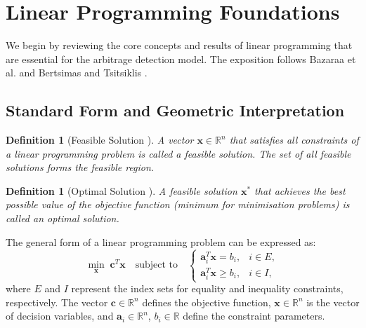 \documentclass[openany]{book}
\numberwithin{figure}{chapter}
\numberwithin{equation}{chapter}
\newtheorem{definition}[theorem]{Definition}
\begin{document}

\section{Linear Programming Foundations}

We begin by reviewing the core concepts and results of linear programming that are essential for the arbitrage detection model. The exposition follows Bazaraa et al. \cite{bazaraa2006} and Bertsimas and Tsitsiklis \cite{bertsimas1997}.

\subsection{Standard Form and Geometric Interpretation}

\begin{definition}[Feasible Solution {\cite{bazaraa2006}}]
A vector $\mathbf{x} \in \mathbb{R}^n$ that satisfies all constraints of a linear programming problem is called a \textit{feasible solution}. The set of all feasible solutions forms the \textit{feasible region}.
\end{definition}

\begin{definition}[Optimal Solution {\cite{bazaraa2006}}]
A feasible solution $\mathbf{x}^*$ that achieves the best possible value of the objective function (minimum for minimisation problems) is called an \textit{optimal solution}.
\end{definition}

The general form of a linear programming problem can be expressed as:
\begin{equation}
\min_{\mathbf{x}} \; \mathbf{c}^T\mathbf{x} \quad \text{subject to} \quad 
\begin{cases}
\mathbf{a}_i^T \mathbf{x} = b_i, & i \in E, \\
\mathbf{a}_i^T \mathbf{x} \geq b_i, & i \in I,
\end{cases}
\label{eq:lp_general}
\end{equation}
where $E$ and $I$ represent the index sets for equality and inequality constraints, respectively. The vector $\mathbf{c} \in \mathbb{R}^n$ defines the objective function, $\mathbf{x} \in \mathbb{R}^n$ is the vector of decision variables, and $\mathbf{a}_i \in \mathbb{R}^n$, $b_i \in \mathbb{R}$ define the constraint parameters.\\
\end{document}
